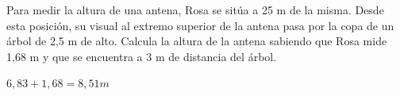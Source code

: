 \documentclass[addpoints,spanish, 12pt,a4paper]{exam}
\begin{document}
\begin{questions}







\question[2] Para medir la altura de una antena, Rosa se sitúa a 25 m de la misma. Desde esta posición, su visual al extremo superior de la antena pasa por la copa de un árbol de 2,5 m de alto. Calcula la altura de la antena sabiendo que Rosa mide 1,68 m y que se encuentra a 3 m de distancia del árbol.
\begin{solution}
    $6,83 + 1,68 = 8,51 m$
\end{solution}






\end{questions}
\end{document}
